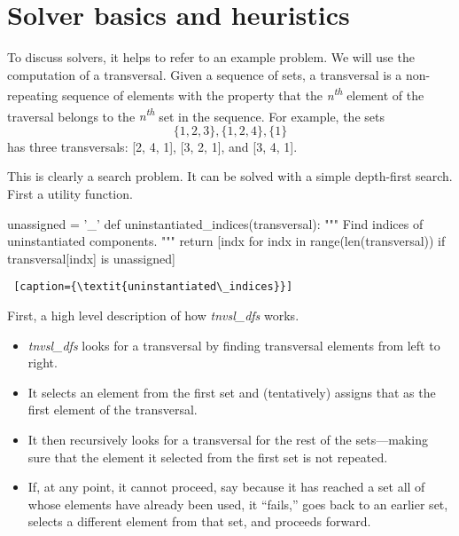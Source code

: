 \section{Solver basics and heuristics} \label{sec:solver-basics}

To discuss solvers, it helps to refer to an example problem. We will use the computation of a transversal. Given a sequence of sets, a transversal is a non-repeating sequence of elements with the property that the \textit{n\textsuperscript{th}} element of the traversal belongs to the \textit{n\textsuperscript{th}} set in the sequence.  For example, the sets \[\{1, 2, 3\}, \{1, 2, 4\}, \{1\}\] has three transversals: [2, 4, 1], [3, 2, 1], and [3, 4, 1]. 

This is clearly a search problem. It can be solved with a simple depth-first search. First a utility function.

\begin{minipage}[c]{0.45\textwidth}
\begin{python1}  
unassigned = '_'
def uninstantiated_indices(transversal):
  """ Find indices of uninstantiated components. """
  return [indx for indx in range(len(transversal)) 
               if transversal[indx] is unassigned]
\end{python1}\linv
\begin{lstlisting} [caption={\textit{uninstantiated\_indices}}]
\end{lstlisting}
\end{minipage}


First, a high level description of how \textit{tnvsl\_dfs} works. 
\begin{itemize}
    \item \textit{tnvsl\_dfs} looks for a transversal by finding transversal elements from left to right.
    \item It selects an element from the first set and (tentatively) assigns that as the first element of the transversal.
    \item It then recursively looks for a transversal for the rest of the sets---making sure that the element it selected from the first set is not repeated.
    \item If, at any point, it cannot proceed, say because it has reached a set all of whose elements have already been used, it ``fails,'' goes back to an earlier set, selects a different element from that set, and proceeds forward.
\end{itemize}

